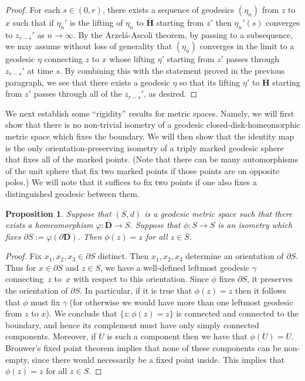 \documentclass[JEP,XML,SOM,Unicode]{cedram}
\theoremstyle{plain}
\numberwithin{theorem}{section}
\newtheorem{proposition}[theorem]{Proposition}
\theoremstyle{definition}
\newcommand{\D}{\mathbf{D}}
\newcommand{\h}{\mathbf{H}}
\let\ol\overline
\begin{document}
\begin{proof}
For each $s \in (0,r)$, there exists a sequence of geodesics $(\eta_n)$ from $z$ to $x$ such that if $\eta_n'$ is the lifting of $\eta_n$ to $\ol{\h}$ starting from $z'$ then $\eta_n'(s)$ converges to $z_{r-s}'$ as $n \to \infty$. By the Arzelá-Ascoli theorem, by passing to a subsequence, we may assume without loss of generality that $(\eta_n)$ converges in the limit to a geodesic $\eta$ connecting $z$ to $x$ whose lifting $\eta'$ starting from $z'$ passes through $z_{r-s}'$ at time $s$. By combining this with the statement proved in the previous paragraph, we see that there exists a geodesic $\eta$ so that its lifting $\eta'$ to $\ol{\h}$ starting from $z'$ passes through all of the $z_{r-s}'$, as desired.
\end{proof}

We next establish some ``rigidity'' results for metric spaces. Namely, we will first show that there is no non-trivial isometry of a geodesic closed-disk-homeomorphic metric space which fixes the boundary. We will then show that the identity map is the only orientation-preserving isometry of a triply marked geodesic sphere that fixes all of the marked points. (Note that there can be many automorphisms of the unit sphere that fix two marked points if those points are on opposite poles.) We will note that it suffices to fix two points if one also fixes a distinguished geodesic between them.

\begin{proposition}
\label{prop::boundaryfixesisometry}
Suppose that $(S,d)$ is a geodesic metric space such that there exists a homeomorphism $\varphi \colon \ol{\D} \to S$. Suppose that $\phi \colon S \to S$ is an isometry which fixes $\partial S := \varphi(\partial \D)$. Then $\phi(z) = z$ for all $z \in S$.
\end{proposition}
\begin{proof}
Fix $x_1,x_2,x_3 \in \partial S$ distinct. Then $x_1,x_2,x_3$ determine an orientation of $\partial S$. Thus for $x \in \partial S$ and $z \in S$, we have a well-defined leftmost geodesic $\gamma$ connecting~$z$ to~$x$ with respect to this orientation. Since $\phi$ fixes $\partial S$, it preserves the orientation of $\partial S$. In particular, if it is true that $\phi(z) = z$ then it follows that $\phi$ must fix $\gamma$ (for otherwise we would have more than one leftmost geodesic from $z$ to $x$). We conclude that $\{z : \phi(z) = z\}$ is connected and connected to the boundary, and hence its complement must have only simply connected components. Moreover, if $U$ is such a component then we have that $\phi(U) = U$. Brouwer's fixed point theorem implies that none of these components can be non-empty, since there would necessarily be a fixed point inside. This implies that $\phi(z) = z$ for all $z \in S$.
\end{proof}
\end{document}
